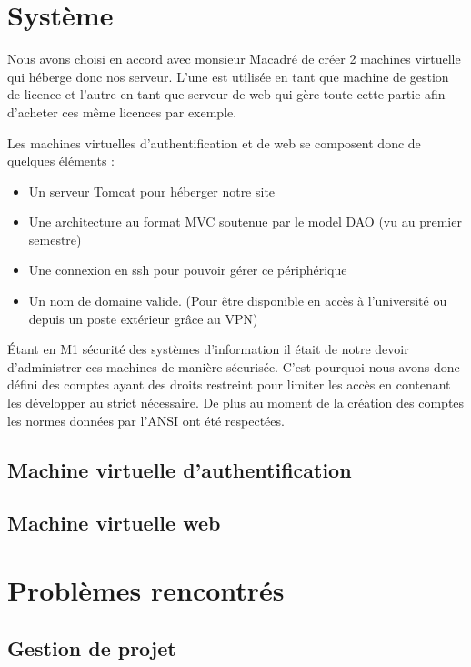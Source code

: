 \chapter{Système}

Nous avons choisi en accord avec monsieur Macadré de créer 2 machines virtuelle qui héberge donc nos serveur. L'une est utilisée en tant que machine de gestion de licence 
et l'autre en tant que serveur de web qui gère toute cette partie afin d'acheter ces même licences par exemple.\newline

Les machines virtuelles d'authentification et de web se composent donc de quelques éléments :\newline

\begin{itemize}
	\item Un serveur Tomcat pour héberger notre site
	\item Une architecture au format MVC soutenue par le model DAO (vu au premier semestre)
	\item Une connexion en ssh pour pouvoir gérer ce périphérique
	\item Un nom de domaine valide. (Pour être disponible en accès à l'université ou depuis un poste extérieur grâce au VPN)\newline
\end{itemize}

Étant en M1 sécurité des systèmes d'information il était de notre devoir d'administrer ces machines de manière sécurisée.
C'est pourquoi nous avons donc défini des comptes ayant des droits restreint pour limiter les accès en contenant les développer au strict nécessaire.
De plus au moment de la création des comptes les normes données par l'ANSI ont été respectées.

\section{Machine virtuelle d'authentification}

\section{Machine virtuelle web}

\chapter{Problèmes rencontrés}

\section{Gestion de projet}

